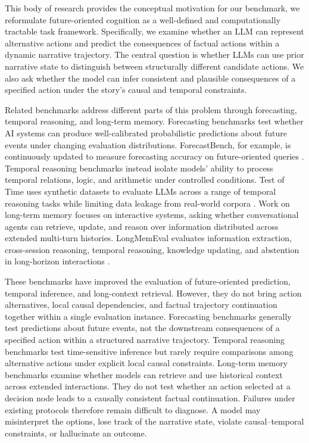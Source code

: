 \documentclass[pdflatex,sn-mathphys-num]{sn-jnl}%
\theoremstyle{thmstyleone}%
\theoremstyle{thmstyletwo}%
\theoremstyle{thmstylethree}%
\begin{document}
This body of research provides the conceptual motivation for our benchmark, we reformulate future-oriented cognition as a well-defined and computationally tractable task framework. Specifically, we examine whether an LLM can represent alternative actions and predict the consequences of factual actions within a dynamic narrative trajectory. The central question is whether LLMs can use prior narrative state to distinguish between structurally different candidate actions. We also ask whether the model can infer consistent and plausible consequences of a specified action under the story's causal and temporal constraints.

Related benchmarks address different parts of this problem through forecasting, temporal reasoning, and long-term memory. Forecasting benchmarks test whether AI systems can produce well-calibrated probabilistic predictions about future events under changing evaluation distributions. ForecastBench, for example, is continuously updated to measure forecasting accuracy on future-oriented queries \cite{karger2024forecastbench}. Temporal reasoning benchmarks instead isolate models' ability to process temporal relations, logic, and arithmetic under controlled conditions. Test of Time uses synthetic datasets to evaluate LLMs across a range of temporal reasoning tasks while limiting data leakage from real-world corpora \cite{fatemi2024test}. Work on long-term memory focuses on interactive systems, asking whether conversational agents can retrieve, update, and reason over information distributed across extended multi-turn histories. LongMemEval evaluates information extraction, cross-session reasoning, temporal reasoning, knowledge updating, and abstention in long-horizon interactions \cite{wu2024longmemeval}.

These benchmarks have improved the evaluation of future-oriented prediction, temporal inference, and long-context retrieval. However, they do not bring action alternatives, local causal dependencies, and factual trajectory continuation together within a single evaluation instance. Forecasting benchmarks generally test predictions about future events, not the downstream consequences of a specified action within a structured narrative trajectory. Temporal reasoning benchmarks test time-sensitive inference but rarely require comparisons among alternative actions under explicit local causal constraints. Long-term memory benchmarks examine whether models can retrieve and use historical context across extended interactions. They do not test whether an action selected at a decision node leads to a causally consistent factual continuation. Failures under existing protocols therefore remain difficult to diagnose. A model may misinterpret the options, lose track of the narrative state, violate causal--temporal constraints, or hallucinate an outcome.
\end{document}

